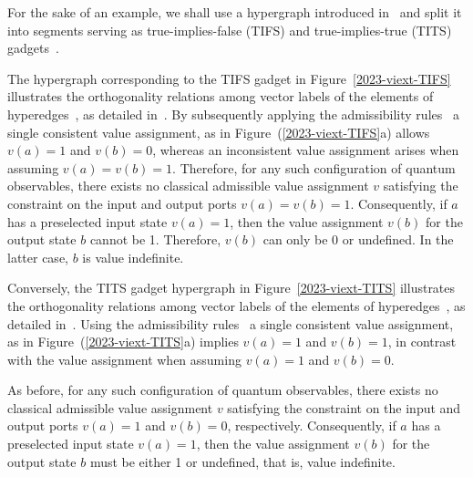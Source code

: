 \documentclass[%
 superscriptaddress,
  preprint,
 showpacs,
 showkeys,
 nofootinbib,
  amsmath,amssymb,
  aps,
 pra,
  longbibliography,
  floatfix,
 ]{revtex4-2}
\theoremstyle{definition}
\begin{document}
\medskip

For the sake of an example, we shall use a hypergraph introduced in~\cite{2015-AnalyticKS}
and split it into segments serving as true-implies-false (TIFS) and true-implies-true (TITS) gadgets~\cite{2018-minimalYIYS}.


The hypergraph corresponding to the TIFS gadget  in Figure~\ref{2023-viext-TIFS}
illustrates the orthogonality relations among vector labels of the elements of hyperedges~\cite{lovasz-79}, as detailed in~\cite[Table~I]{2018-minimalYIYS}.
By subsequently applying the admissibility rules~\cite[Figure~(24.2.a)]{Svozil-2018-p} a single consistent value assignment,
as in Figure~(\ref{2023-viext-TIFS}a) allows $v(a)=1$ and $v(b)=0$, whereas
an inconsistent value assignment arises when assuming $v(a)=v(b)=1$.
Therefore, for any such configuration of quantum observables, there exists no classical admissible value assignment $v$
satisfying the constraint on the input and output ports $v(a)=v(b)=1$.
Consequently, if $a$ has a preselected input state $v(a)=1$, then
the value assignment $v(b)$ for the output state $b$ cannot be 1.
Therefore, $v(b)$ can only be 0 or undefined.
In the latter case, $b$
is value indefinite.




Conversely, the TITS gadget hypergraph in Figure~\ref{2023-viext-TITS}
illustrates the orthogonality relations among vector labels of the elements of hyperedges~\cite{lovasz-79}, as detailed in~\cite[Table~I]{2018-minimalYIYS}.
Using the admissibility rules~\cite[Fig.~(24.2.a)]{Svozil-2018-p} a single consistent value assignment,
as in Figure~(\ref{2023-viext-TITS}a) implies $v(a)=1$ and $v(b)=1$, in contrast with
the value assignment  when assuming $v(a)=1$ and $v(b)=0$.

As before, for any such configuration of quantum observables, there exists no classical admissible value assignment $v$
satisfying the constraint on the input and output ports $v(a)=1$ and $v(b)=0$, respectively.
Consequently, if $a$ has a preselected input state $v(a)=1$, then the value assignment $v(b)$ for the output state $b$ must be either 1 or undefined,
that is, value indefinite.
\end{document}
